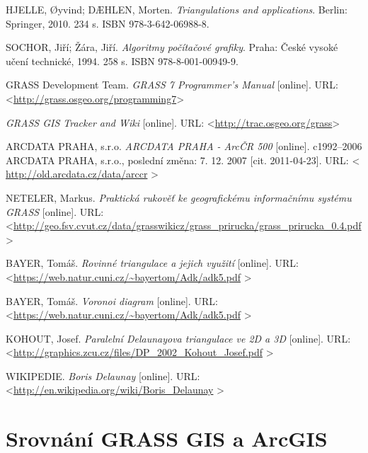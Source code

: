 \documentclass[12pt,a4paper]{article}
\begin{document}
\begin{thebibliography}{99}
\label{literatura}


HJELLE, Øyvind; DÆHLEN, Morten. \textit{Triangulations and applications}. Berlin: Springer, 2010. 234 s. ISBN 978-3-642-06988-8.


SOCHOR, Jiří; Žára, Jiří. \textit{Algoritmy počítačové grafiky}. Praha: České vysoké učení technické, 1994. 258 s. ISBN 978-8-001-00949-9.


GRASS Development Team. \textit{GRASS 7 Programmer's Manual} [online].
URL: \textless\url{http://grass.osgeo.org/programming7}\textgreater


\textit{GRASS GIS Tracker and Wiki} [online]. 
URL: \textless\url{http://trac.osgeo.org/grass}\textgreater


ARCDATA PRAHA, s.r.o. \textit{ARCDATA PRAHA - ArcČR 500} [online].
c1992–2006 ARCDATA PRAHA, s.r.o., poslední změna: 7. 12. 2007 [cit. 2011-04-23].
URL: \textless
\url{http://old.arcdata.cz/data/arccr} \textgreater

NETELER, Markus. \textit{Praktická rukověť ke geografickému informačnímu systému GRASS} [online].
URL: \textless\url{http://geo.fsv.cvut.cz/data/grasswikicz/grass_prirucka/grass_prirucka_0.4.pdf}
\textgreater

BAYER, Tomáš. \textit{Rovinné triangulace a jejich využití} [online].
URL: \textless\url{https://web.natur.cuni.cz/~bayertom/Adk/adk5.pdf}
\textgreater

BAYER, Tomáš. \textit{Voronoi diagram} [online].
URL: \textless\url{https://web.natur.cuni.cz/~bayertom/Adk/adk5.pdf}
\textgreater

KOHOUT, Josef. \textit{Paralelní Delaunayova triangulace
ve 2D a 3D} [online].
URL: \textless\url{http://graphics.zcu.cz/files/DP_2002_Kohout_Josef.pdf}
\textgreater

WIKIPEDIE. \textit{Boris Delaunay} [online].
URL: \textless\url{http://en.wikipedia.org/wiki/Boris_Delaunay}
\textgreater

\end{thebibliography}

\appendix
\newpage
\section{Srovnání GRASS GIS a ArcGIS}
\label{app:srovnani}
\end{document}
